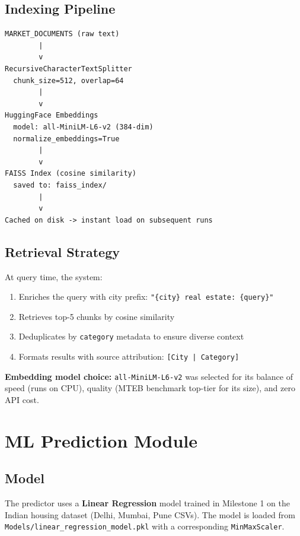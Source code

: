 \documentclass[12pt,a4paper]{article}
\newcommand{\code}[1]{\texttt{\small #1}}
\begin{document}
\subsection{Indexing Pipeline}

\begin{lstlisting}[language={}, caption={RAG indexing pipeline}]
MARKET_DOCUMENTS (raw text)
        |
        v
RecursiveCharacterTextSplitter
  chunk_size=512, overlap=64
        |
        v
HuggingFace Embeddings
  model: all-MiniLM-L6-v2 (384-dim)
  normalize_embeddings=True
        |
        v
FAISS Index (cosine similarity)
  saved to: faiss_index/
        |
        v
Cached on disk -> instant load on subsequent runs
\end{lstlisting}

\subsection{Retrieval Strategy}

At query time, the system:
\begin{enumerate}[leftmargin=1.5em]
  \item Enriches the query with city prefix: \code{"\{city\} real estate: \{query\}"}
  \item Retrieves top-5 chunks by cosine similarity
  \item Deduplicates by \code{category} metadata to ensure diverse context
  \item Formats results with source attribution: \code{[City | Category]}
\end{enumerate}

\textbf{Embedding model choice:} \code{all-MiniLM-L6-v2} was selected for its balance of speed (runs on CPU), quality (MTEB benchmark top-tier for its size), and zero API cost.

\section{ML Prediction Module}

\subsection{Model}

The predictor uses a \textbf{Linear Regression} model trained in Milestone 1 on the Indian housing dataset (Delhi, Mumbai, Pune CSVs). The model is loaded from \code{Models/linear\_regression\_model.pkl} with a corresponding \code{MinMaxScaler}.
\end{document}
